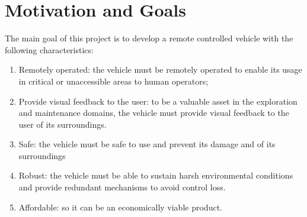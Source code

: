 %
\section{Motivation and Goals}
The main goal of this project is to develop a remote controlled vehicle with the
following characteristics:
\begin{enumerate}
  \item Remotely operated: the vehicle must be remotely operated to enable its
    usage in critical or unaccessible areas to human operators;
  \item Provide visual feedback to the user: to be a valuable asset in the
    exploration and maintenance domains, the vehicle must provide visual
    feedback to the user of its surroundings.
  \item Safe: the vehicle must be safe to use and prevent its damage and of its
    surroundings
  \item Robust: the vehicle must be able to sustain harsh environmental
    conditions and provide redundant mechanisms to avoid control loss.
  \item Affordable: so it can be an economically viable product.
  \end{enumerate}
